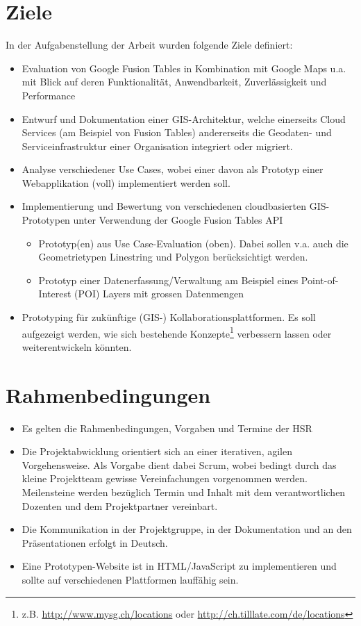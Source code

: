 \section{Ziele}
In der Aufgabenstellung der Arbeit wurden folgende Ziele definiert:
\begin{itemize}
\item Evaluation von Google Fusion Tables in Kombination mit Google Maps u.a. mit Blick auf deren Funktionalität, Anwendbarkeit, Zuverlässigkeit und Performance
\item Entwurf und Dokumentation einer \gls{GIS}-Architektur, welche einerseits \gls{Cloud} Services (am Beispiel von Fusion Tables) andererseits die Geodaten- und Serviceinfrastruktur einer Organisation integriert oder migriert.
\item Analyse verschiedener Use Cases, wobei einer davon als Prototyp einer Webapplikation (voll) implementiert werden soll. 
\item Implementierung und Bewertung von verschiedenen cloudbasierten \gls{GIS}-Prototypen unter Verwendung der Google Fusion Tables \gls{API}
\begin{itemize}
	\item Prototyp(en) aus Use Case-Evaluation (oben). Dabei sollen v.a. auch die Geometrietypen Linestring und Polygon berücksichtigt werden.
	\item Prototyp einer Datenerfassung/Verwaltung am Beispiel eines Point-of-Interest (POI) Layers mit grossen Datenmengen
\end{itemize}
\item Prototyping für zukünftige (\gls{GIS}-) Kollaborationsplattformen. Es soll aufgezeigt werden, wie sich bestehende Konzepte\footnote{z.B. \url{http://www.mysg.ch/locations} oder \url{http://ch.tilllate.com/de/locations}} verbessern lassen oder weiterentwickeln könnten.
\end{itemize}

\section{Rahmenbedingungen}
\begin{itemize}
\item Es gelten die Rahmenbedingungen, Vorgaben und Termine der HSR
\item Die Projektabwicklung orientiert sich an einer iterativen, agilen Vorgehensweise. Als Vorgabe dient dabei Scrum, wobei bedingt durch das kleine Projektteam gewisse Vereinfachungen vorgenommen werden. Meilensteine werden bezüglich Termin und Inhalt mit dem verantwortlichen Dozenten und dem Projektpartner vereinbart.
\item Die Kommunikation in der Projektgruppe, in der Dokumentation und an den Präsentationen erfolgt in Deutsch.
\item Eine Prototypen-Website ist in HTML/JavaScript zu implementieren und sollte auf verschiedenen Plattformen lauffähig sein.
\end{itemize}

